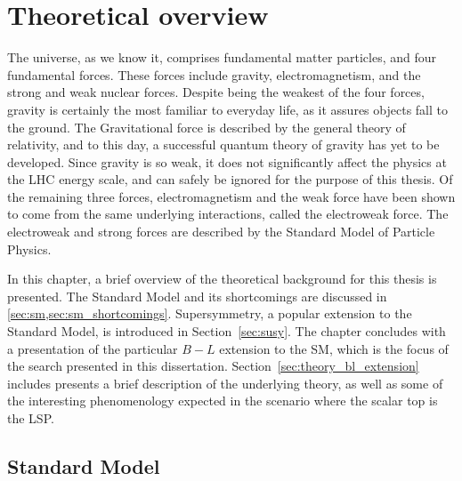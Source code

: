 \chapter[Theoretical overview][Theory]{Theoretical overview}
\label{ch:theory}

The universe, as we know it, comprises fundamental matter particles, and
four fundamental forces.
These forces include gravity, electromagnetism, and the strong and weak nuclear
forces.
Despite being the weakest of the four forces, gravity is certainly the most
familiar to everyday life, as it assures objects fall to the ground.
The Gravitational force is described by the general theory of relativity, and
to this day, a successful quantum theory of gravity has yet to be developed.
Since gravity is so weak, it does not significantly affect the physics at the
LHC energy scale, and can safely be ignored for the purpose of this thesis.
Of the remaining three forces,  electromagnetism and the weak force have been
shown to come from the same underlying interactions, called the electroweak
force.
The electroweak and strong forces are described by the Standard Model of
Particle Physics.

In this chapter, a brief overview of the theoretical background for this thesis
is presented.
The Standard Model and its shortcomings are discussed
in \cref{sec:sm,sec:sm_shortcomings}.
Supersymmetry, a popular extension to the Standard Model, is introduced in
Section~\ref{sec:susy}.
The chapter concludes with a presentation of the particular $B-L$ extension to
the SM, which is the focus of the search presented in this dissertation.
Section~\ref{sec:theory_bl_extension} includes presents a brief description of
the underlying theory, as well as some of the interesting phenomenology expected
in the scenario where the scalar top is the LSP.

\FloatBarrier
\section{Standard Model}
\label{sec:sm}

